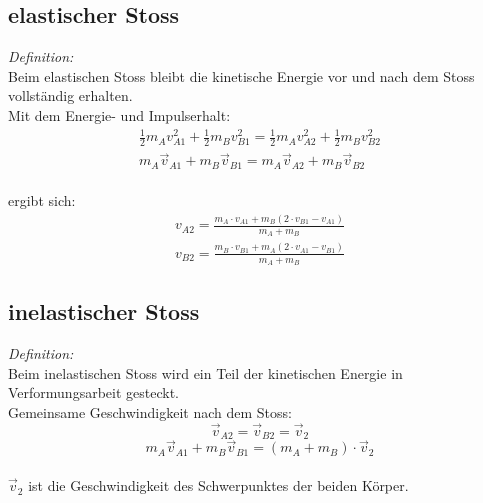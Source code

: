 \subsection{elastischer Stoss}
\textit{Definition:}\\
Beim elastischen Stoss bleibt die kinetische Energie vor und nach dem Stoss vollst\"andig erhalten.\\
\newline
Mit dem Energie- und Impulserhalt:
\[\begin{split}
	\frac{1}{2}m_Av_{A1}^2+\frac{1}{2}m_Bv_{B1}^2=\frac{1}{2}m_Av_{A2}^2+\frac{1}{2}m_Bv_{B2}^2\\
	m_A\vec{v}_{A1}+m_B\vec{v}_{B1}=m_A\vec{v}_{A2}+m_B\vec{v}_{B2}
\end{split}\]\\
ergibt sich:
\[
	\boxed{\begin{split}
		v_{A2}=\frac{m_A\cdot v_{A1}+m_B(2\cdot v_{B1}-v_{A1})}{m_A+m_B}\\
		v_{B2}=\frac{m_B\cdot v_{B1}+m_A(2\cdot v_{A1}-v_{B1})}{m_A+m_B}
	\end{split}}
\]

\subsection{inelastischer Stoss}
\textit{Definition:}\\
Beim inelastischen Stoss wird ein Teil der kinetischen Energie in Verformungsarbeit gesteckt.\\
\newline
Gemeinsame Geschwindigkeit nach dem Stoss:
\[
	\vec{v}_{A2}=\vec{v}_{B2}=\vec{v}_{2}
\]
\[
	\boxed{
		m_A\vec{v}_{A1}+m_B\vec{v}_{B1}=(m_A+m_B)\cdot\vec{v}_2
	}
\]\\
$\vec{v}_2$ ist die Geschwindigkeit des Schwerpunktes der beiden K\"orper.